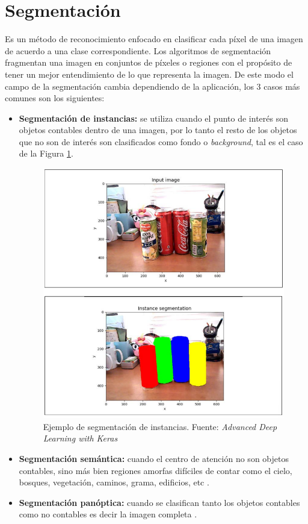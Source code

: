\section{Segmentación}
Es un método de reconocimiento enfocado en clasificar cada píxel de una imagen de acuerdo a una clase correspondiente. Los algoritmos de segmentación fragmentan una imagen en conjuntos de píxeles o regiones con el propósito de tener un mejor entendimiento de lo que representa la imagen. De este modo el campo de la segmentación cambia dependiendo de la aplicación, los 3 casos más comunes son los siguientes:
\begin{itemize}
    \item \textbf{Segmentación de instancias:} se utiliza cuando el punto de interés son objetos contables dentro de una imagen, por lo tanto el resto de los objetos que no son de interés son clasificados como fondo o \textit{background}\cite{Atienza2018}, tal es el caso de la Figura \ref{instance_segmentation}.
    \begin{figure}[H]
        \centering
        \includegraphics[scale=0.5]{Recursos/instance_segmentation.png}
        \caption[Ejemplo de segmentación de instancias.]{Ejemplo de segmentación de instancias. {\footnotesize Fuente: \textit{Advanced Deep Learning with Keras} \cite{Atienza2018}}}
        \label{instance_segmentation}
    \end{figure}
    \item \textbf{Segmentación semántica:} cuando el centro de atención no son objetos contables, sino más bien regiones amorfas difíciles de contar como el cielo, bosques, vegetación, caminos, grama, edificios, etc \cite{Atienza2018}.
    \item \textbf{Segmentación panóptica:} cuando se clasifican tanto los objetos contables como no contables es decir la imagen completa \cite{Atienza2018}.
\end{itemize}
